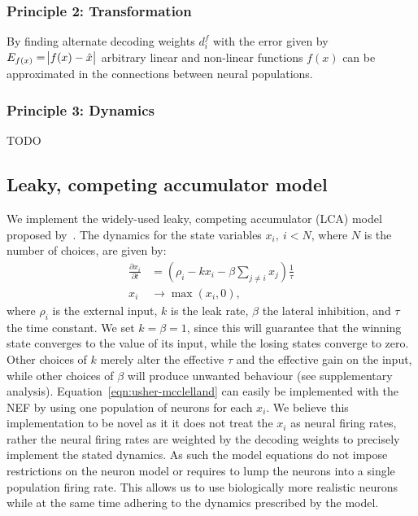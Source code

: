 \documentclass[10pt,letterpaper]{article}
\begin{document}
\subsubsection{Principle 2: Transformation}
By finding alternate decoding weights $d^f_i$ with the error given by $E_{f(x)} 
= \abs{f(x) - \hat x}$ arbitrary linear and non-linear functions $f(x)$ can be approximated in the connections between neural populations.

\subsubsection{Principle 3: Dynamics}
TODO \subsection{Leaky, competing accumulator model}
We implement the widely-used leaky, competing accumulator (LCA) model proposed by~.
The dynamics for the state variables $x_i,\ i < N$, where $N$ is the number of choices, are given by:
\begin{equation} \label{eqn:usher-mcclelland}
    \begin{split}
        \frac{{\partial x}_i}{\partial t} &= \left(\rho_i - kx_i - \beta \sum_{j \neq i} x_j\right) \frac{1}{\tau} \\
        x_i &\rightarrow \max(x_i, 0) ,
    \end{split}
\end{equation}
where $\rho_i$ is the external input, $k$ is the leak rate, $\beta$ the lateral inhibition, and $\tau$ the time constant.
We set $k = \beta = 1$, since this will guarantee that the winning state converges to the value of its input, while the losing states converge to zero.
Other choices of $k$ merely alter the effective $\tau$ and the effective gain on the input, while other choices of $\beta$ will produce unwanted behaviour (see supplementary analysis).
Equation~\ref{eqn:usher-mcclelland} can easily be implemented with the NEF by using one population of neurons for each $x_i$.
We believe this implementation to be novel as it it does not treat the $x_i$ as neural firing rates, rather the neural firing rates are weighted by the decoding weights to precisely implement the stated dynamics.
As such the model equations do not impose restrictions on the neuron model or requires to lump the neurons into a single population firing rate.
This allows us to use biologically more realistic neurons while at the same time adhering to the dynamics prescribed by the model.
\end{document}
